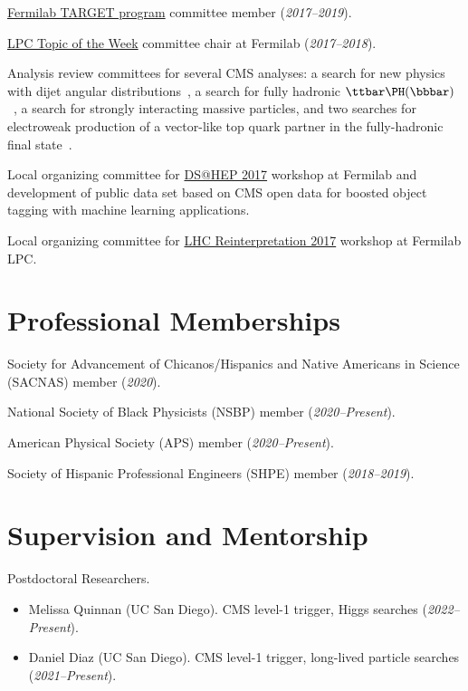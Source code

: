 \documentclass{res}
\newcommand{\MarginText}[1]{\section{#1}\vspace{10pt}}
\begin{document}
\begin{resume}
{    \href{http://diversity.fnal.gov/target/}{Fermilab TARGET program} committee member (\textit{2017--2019}).

    \href{http://lpc.fnal.gov/programs/topic/}{LPC Topic of the Week} committee chair at Fermilab (\textit{2017--2018}).

    Analysis review committees for several CMS analyses: a search for new physics with dijet angular distributions~\cite{Sirunyan:2018wcm}, a search for fully hadronic $\ttbar\PH(\bbbar)$~\cite{Sirunyan:2018ygk}, a search for strongly interacting massive particles, and two searches for electroweak production of a vector-like top quark partner in the fully-hadronic final state~\cite{Sirunyan:2019xeh}.

    Local organizing committee for \href{http://dshep.fnal.gov}{DS@HEP 2017} workshop at Fermilab and development of public data set based on CMS open data for boosted object tagging with machine learning applications.

    Local organizing committee for \href{https://indico.cern.ch/event/639314/}{LHC Reinterpretation 2017} workshop at Fermilab LPC.

    \MarginText{Professional Memberships}

    Society for Advancement of Chicanos/Hispanics and Native Americans in Science (SACNAS) member (\textit{2020}).

    National Society of Black Physicists (NSBP) member (\textit{2020--Present}).

    American Physical Society (APS) member (\textit{2020--Present}).

    Society of Hispanic Professional Engineers (SHPE) member (\textit{2018--2019}).

  }{}


  \MarginText{Supervision and Mentorship}

  Postdoctoral Researchers.
  \begin{itemize}
    \itemsep-0.3em
    \item Melissa Quinnan (UC San Diego). CMS level-1 trigger, Higgs searches (\textit{2022--Present}).
    \item Daniel Diaz (UC San Diego). CMS level-1 trigger, long-lived particle searches (\textit{2021--Present}).
  \end{itemize}


\end{resume}
\end{document}
